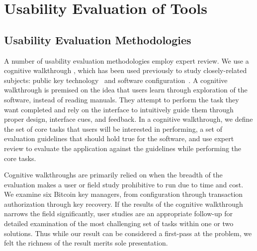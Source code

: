 

\section{Usability Evaluation of Tools}
\subsection{Usability Evaluation Methodologies}
A number of usability evaluation methodologies employ expert review. We use a cognitive walkthrough \cite{WRLP94}, which has been used previously to study closely-related subjects: public key technology~\cite{WT99} and software configuration~\cite{COA07}. A cognitive walkthrough is premised on the idea that users learn through exploration of the software, instead of reading manuals. They attempt to perform the task they want completed and rely on the interface to intuitively guide them through proper design, interface cues, and feedback. In a cognitive walkthrough, we define the set of core tasks that users will be interested in performing, a set of evaluation guidelines that should hold true for the software, and use expert review to evaluate the application against the guidelines while performing the core tasks. 

Cognitive walkthroughs are primarily relied on when the breadth of the evaluation makes a user or field study prohibitive to run due to time and cost. We examine six Bitcoin key managers, from configuration through transaction authorization through key recovery. If the results of the cognitive walkthrough narrows the field significantly, user studies are an appropriate follow-up for detailed examination of the most challenging set of tasks within one or two solutions. Thus while our result can be considered a first-pass at the problem, we felt the richness of the result merits sole presentation.

